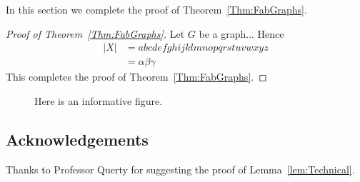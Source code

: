 \documentclass[12pt]{article}
\theoremstyle{plain}
\theoremstyle{definition}
\theoremstyle{remark}
\begin{document}
In this section we complete the proof of Theorem~\ref{Thm:FabGraphs}.

\begin{proof}[Proof of Theorem~\ref{Thm:FabGraphs}]
Let $G$ be a graph... Hence
  \begin{align}
    |X| &= abcdefghijklmnopqrstuvwxyz \nonumber\\
    &= \alpha\beta\gamma
  \end{align}
  This completes the proof of Theorem~\ref{Thm:FabGraphs}.
\end{proof}

\begin{figure}[!h]
  \begin{center}
  \end{center}
  \caption{\label{fig:InformativeFigure} Here is an informative
    figure.}
\end{figure}

\subsection*{Acknowledgements}
Thanks to Professor Querty for suggesting the proof of
Lemma~\ref{lem:Technical}.

%  
%  
\end{document}

